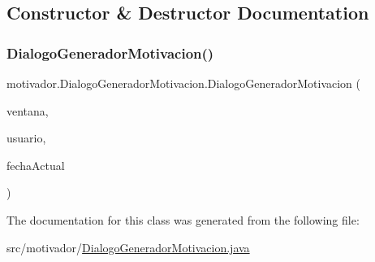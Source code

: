 \subsection{Constructor \& Destructor Documentation}
\mbox{\label{classmotivador_1_1_dialogo_generador_motivacion_adb06fc95a81a1d0670512a66eee9f0fc}} 
\subsubsection{\texorpdfstring{Dialogo\+Generador\+Motivacion()}{DialogoGeneradorMotivacion()}}
{\footnotesize\ttfamily motivador.\+Dialogo\+Generador\+Motivacion.\+Dialogo\+Generador\+Motivacion (\begin{DoxyParamCaption}\item[{J\+Frame}]{ventana,  }\item[{\mbox{\hyperlink{classclases_1_1_usuario}{Usuario}}}]{usuario,  }\item[{String}]{fecha\+Actual }\end{DoxyParamCaption})}



The documentation for this class was generated from the following file\+:\begin{DoxyCompactItemize}
\item 
src/motivador/\mbox{\hyperlink{_dialogo_generador_motivacion_8java}{Dialogo\+Generador\+Motivacion.\+java}}\end{DoxyCompactItemize}
